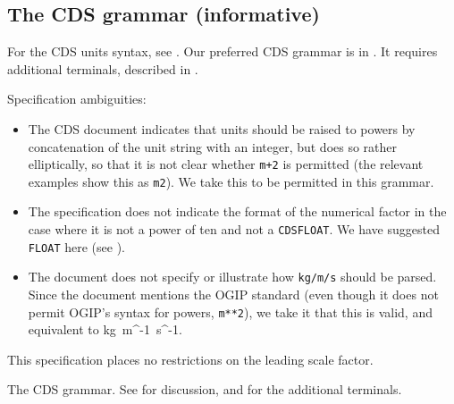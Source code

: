 \documentclass[11pt,notitlepage,onecolumn]{ivoa}
\makeatletter
\def\units{\@ifstar{\let\un@tsspace\relax    \un@ts}%
                   {\let\un@tsspace\thinspace\un@ts}}
\newcommand{\un@ts}[1]{{\let~\thinspace
  \ifmmode
    \un@tsspace\mathrm{#1}%
  \else
    \nobreak$\un@tsspace\mathrm{#1}$%
  \fi}}
\makeatother
\begin{document}
\subsection{The CDS grammar (informative)}
\label{appx:cdsgrammar}

For the CDS units syntax, see \cite[\S3.2]{cds00}.  Our preferred CDS
grammar is in .  It requires additional
terminals, described in .

Specification ambiguities:
\begin{itemize}
\item The CDS document indicates that units should be raised to powers by
concatenation of the unit string with an integer, but does so rather
elliptically, so that it is not clear whether \texttt{m+2} is
permitted (the relevant examples show this as \texttt{m2}).  We take
this to be permitted in this grammar.
\item The specification does not indicate the format of the numerical
  factor in the case where it is not a power of ten and not
  a \texttt{CDSFLOAT}.  We have suggested \texttt{FLOAT} here
  (see ).
\item The document does not specify or illustrate how \texttt{kg/m/s}
should be parsed.  Since the document mentions the OGIP standard (even
though it does not permit OGIP's syntax for powers, \texttt{m**2}), we
take it that this is valid, and equivalent to \units{kg~m^{-1}~s^{-1}}.
\end{itemize}

This specification places no restrictions on the leading scale factor.


\begin{table}[ht]

\caption[The CDS grammar]{\label{tabx:cdsgrammar}The CDS grammar.
See  for discussion,
and  for the additional terminals.}
\end{table}
\end{document}
